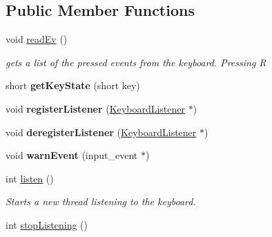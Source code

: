 \subsection*{Public Member Functions}
\begin{DoxyCompactItemize}
\item 
\hypertarget{classc_keyboard_a2eeb7d5dc750a6ce73befe70705c1751}{}void \hyperlink{classc_keyboard_a2eeb7d5dc750a6ce73befe70705c1751}{read\+Ev} ()\label{classc_keyboard_a2eeb7d5dc750a6ce73befe70705c1751}

\begin{DoxyCompactList}\small\item\em gets a list of the pressed events from the keyboard. Pressing R \end{DoxyCompactList}\item 
\hypertarget{classc_keyboard_ac60892c71a46e7fc67a19ea75a4a394f}{}short {\bfseries get\+Key\+State} (short key)\label{classc_keyboard_ac60892c71a46e7fc67a19ea75a4a394f}

\item 
\hypertarget{classc_keyboard_a5be1e8b98017298f094ff418e18a5af9}{}void {\bfseries register\+Listener} (\hyperlink{class_keyboard_listener}{Keyboard\+Listener} $\ast$)\label{classc_keyboard_a5be1e8b98017298f094ff418e18a5af9}

\item 
\hypertarget{classc_keyboard_ad829c57a7662e5c6115d059c9739c9bf}{}void {\bfseries deregister\+Listener} (\hyperlink{class_keyboard_listener}{Keyboard\+Listener} $\ast$)\label{classc_keyboard_ad829c57a7662e5c6115d059c9739c9bf}

\item 
\hypertarget{classc_keyboard_a77b96029cc90ff2df970249570955024}{}void {\bfseries warn\+Event} (input\+\_\+event $\ast$)\label{classc_keyboard_a77b96029cc90ff2df970249570955024}

\item 
\hypertarget{classc_keyboard_a4facfef83ec4b2e66d114c3393ebd5e7}{}int \hyperlink{classc_keyboard_a4facfef83ec4b2e66d114c3393ebd5e7}{listen} ()\label{classc_keyboard_a4facfef83ec4b2e66d114c3393ebd5e7}

\begin{DoxyCompactList}\small\item\em Starts a new thread listening to the keyboard. \end{DoxyCompactList}\item 
\hypertarget{classc_keyboard_a6eb520c368e14d18fc417531c5c0b809}{}int \hyperlink{classc_keyboard_a6eb520c368e14d18fc417531c5c0b809}{stop\+Listening} ()\label{classc_keyboard_a6eb520c368e14d18fc417531c5c0b809}


\end{DoxyCompactItemize}

